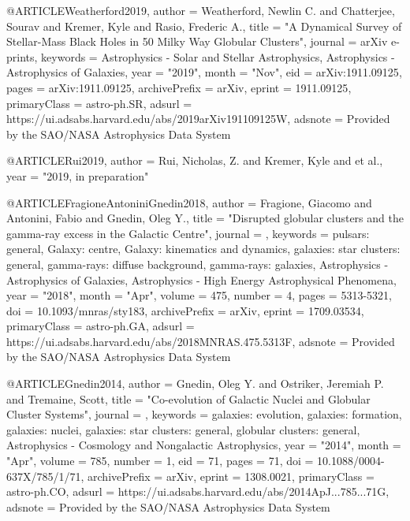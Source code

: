 \documentclass[twocolumn,tighten]{aastex63}
\begin{document}
@ARTICLE{Weatherford2019,
       author = {{Weatherford}, Newlin C. and {Chatterjee}, Sourav and {Kremer}, Kyle and
         {Rasio}, Frederic A.},
        title = "{A Dynamical Survey of Stellar-Mass Black Holes in 50 Milky Way Globular Clusters}",
      journal = {arXiv e-prints},
     keywords = {Astrophysics - Solar and Stellar Astrophysics, Astrophysics - Astrophysics of Galaxies},
         year = "2019",
        month = "Nov",
          eid = {arXiv:1911.09125},
        pages = {arXiv:1911.09125},
archivePrefix = {arXiv},
       eprint = {1911.09125},
 primaryClass = {astro-ph.SR},
       adsurl = {https://ui.adsabs.harvard.edu/abs/2019arXiv191109125W},
      adsnote = {Provided by the SAO/NASA Astrophysics Data System}
}

 @ARTICLE{Rui2019,
       author = {{Rui}, Nicholas, Z. and {Kremer}, Kyle and et al.},
         year = "2019, in preparation"
}
 
 @ARTICLE{FragioneAntoniniGnedin2018,
       author = {{Fragione}, Giacomo and {Antonini}, Fabio and {Gnedin}, Oleg Y.},
        title = "{Disrupted globular clusters and the gamma-ray excess in the Galactic Centre}",
      journal = {\mnras},
     keywords = {pulsars: general, Galaxy: centre, Galaxy: kinematics and dynamics, galaxies: star clusters: general, gamma-rays: diffuse background, gamma-rays: galaxies, Astrophysics - Astrophysics of Galaxies, Astrophysics - High Energy Astrophysical Phenomena},
         year = "2018",
        month = "Apr",
       volume = {475},
       number = {4},
        pages = {5313-5321},
          doi = {10.1093/mnras/sty183},
archivePrefix = {arXiv},
       eprint = {1709.03534},
 primaryClass = {astro-ph.GA},
       adsurl = {https://ui.adsabs.harvard.edu/abs/2018MNRAS.475.5313F},
      adsnote = {Provided by the SAO/NASA Astrophysics Data System}
}

@ARTICLE{Gnedin2014,
       author = {{Gnedin}, Oleg Y. and {Ostriker}, Jeremiah P. and {Tremaine}, Scott},
        title = "{Co-evolution of Galactic Nuclei and Globular Cluster Systems}",
      journal = {\apj},
     keywords = {galaxies: evolution, galaxies: formation, galaxies: nuclei, galaxies: star clusters: general, globular clusters: general, Astrophysics - Cosmology and Nongalactic Astrophysics},
         year = "2014",
        month = "Apr",
       volume = {785},
       number = {1},
          eid = {71},
        pages = {71},
          doi = {10.1088/0004-637X/785/1/71},
archivePrefix = {arXiv},
       eprint = {1308.0021},
 primaryClass = {astro-ph.CO},
       adsurl = {https://ui.adsabs.harvard.edu/abs/2014ApJ...785...71G},
      adsnote = {Provided by the SAO/NASA Astrophysics Data System}
}
\end{document}

